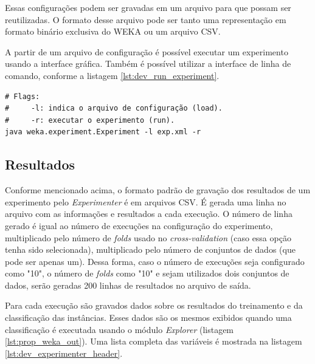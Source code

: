 Essas configurações podem ser gravadas em um arquivo para que possam ser reutilizadas. O formato desse arquivo pode ser tanto uma representação em formato binário exclusiva do WEKA ou um arquivo CSV.

A partir de um arquivo de configuração é possível executar um experimento usando a interface gráfica. Também é possível utilizar a interface de linha de comando, conforme a listagem \ref{lst:dev_run_experiment}.

\vspace{0.5cm}
\begin{lstlisting}[caption=Execução de um experimento, label=lst:dev_run_experiment]
# Flags:
#     -l: indica o arquivo de configuração (load).
#     -r: executar o experimento (run).
java weka.experiment.Experiment -l exp.xml -r
\end{lstlisting}
\vspace{0.5cm}

\subsection{Resultados}

Conforme mencionado acima, o formato padrão de gravação dos resultados de um experimento pelo \emph{Experimenter} é em arquivos CSV. É gerada uma linha no arquivo com as informações e resultados a cada execução. O número de linha gerado é igual ao número de execuções na configuração do experimento, multiplicado pelo número de \emph{folds} usado no \emph{cross-validation} (caso essa opção tenha sido selecionada), multiplicado pelo número de conjuntos de dados (que pode ser apenas um). Dessa forma, caso o número de execuções seja configurado como "10", o número de \emph{folds} como "10" e sejam utilizados dois conjuntos de dados, serão geradas 200 linhas de resultados no arquivo de saída.

Para cada execução são gravados dados sobre os resultados do treinamento e da classificação das instâncias. Esses dados são os mesmos exibidos quando uma classificação é executada usando o módulo \emph{Explorer} (listagem \ref{lst:prop_weka_out}). Uma lista completa das variáveis é mostrada na listagem \ref{lst:dev_experimenter_header}.

